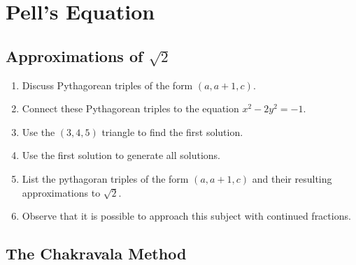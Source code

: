 \chapter{Pell's Equation}

\section{Approximations of \texorpdfstring{$\sqrt{2}$}{√2}}

\begin{enumerate}
\item Discuss Pythagorean triples of the form $(a,a+1,c)$.
\item Connect these Pythagorean triples to the equation $x^2-2y^2=-1$.
\item Use the $(3,4,5)$ triangle to find the first solution.
\item Use the first solution to generate all solutions.
\item List the pythagoran triples of the form $(a,a+1,c)$ and their resulting approximations to $\sqrt{2}$.
\item Observe that it is possible to approach this subject with continued fractions.
\end{enumerate}

\section{The Chakravala Method}

